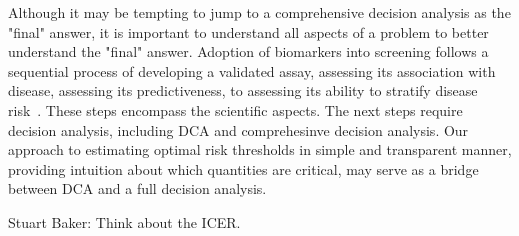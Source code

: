 \documentclass[AMA,STIX1COL]{WileyNJD-v2}
\begin{document}
Although it may be tempting to jump to a comprehensive decision analysis as the "final" answer, it is important to understand all aspects of a problem to better understand the "final" answer.  Adoption of biomarkers into screening follows a sequential process of developing a validated assay, assessing its association with disease, assessing its predictiveness, to assessing its ability to stratify disease risk~\citep{Katki2019}.  These steps encompass the scientific aspects.  The next steps require decision analysis, including DCA and comprehesinve decision analysis.  Our approach to estimating optimal risk thresholds in simple and transparent manner, providing intuition about which quantities are critical, may serve as a bridge between DCA and a full decision analysis.

Stuart Baker:  Think about the ICER.






\end{document}
